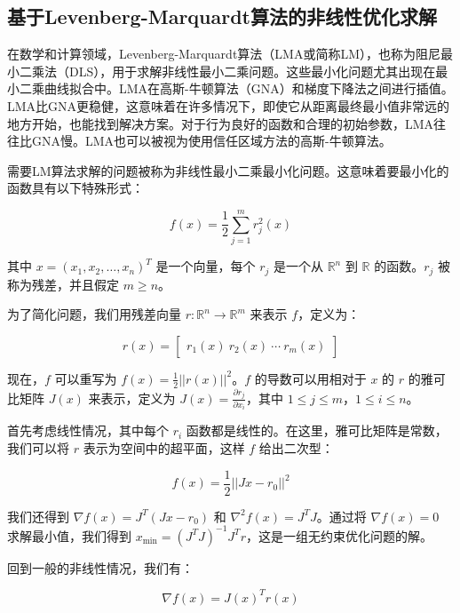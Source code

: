 \subsection{基于Levenberg-Marquardt算法的非线性优化求解}
在数学和计算领域，Levenberg-Marquardt算法（LMA或简称LM）\cite{levenberg1944method}，也称为阻尼最小二乘法（DLS），用于求解非线性最小二乘问题。这些最小化问题尤其出现在最小二乘曲线拟合中。LMA在高斯-牛顿算法（GNA）\cite{}和梯度下降法之间进行插值。LMA比GNA更稳健，这意味着在许多情况下，即使它从距离最终最小值非常远的地方开始，也能找到解决方案。对于行为良好的函数和合理的初始参数，LMA往往比GNA慢。LMA也可以被视为使用信任区域方法的高斯-牛顿算法。

需要LM算法求解的问题被称为非线性最小二乘最小化问题。这意味着要最小化的函数具有以下特殊形式：

\begin{equation}
f(x) = \frac{1}{2} \sum_{j=1}^{m} r_j^2(x)
\end{equation}

其中 $x = (x_1, x_2, \dots, x_n)^T$ 是一个向量，每个 $r_j$ 是一个从 $\mathbb{R}^n$ 到 $\mathbb{R}$ 的函数。$r_j$ 被称为残差，并且假定 $m \geq n$。

为了简化问题，我们用残差向量 $r : \mathbb{R}^n \rightarrow \mathbb{R}^m$ 来表示 $f$，定义为：

\begin{equation}
r(x) =
\begin{bmatrix}
r_1(x) \
r_2(x) \
\cdots \
r_m(x)
\end{bmatrix}
\end{equation}

现在，$f$ 可以重写为 $f(x) = \frac{1}{2} ||r(x)||^2$。$f$ 的导数可以用相对于 $x$ 的 $r$ 的雅可比矩阵 $J(x)$ 来表示，定义为 $J(x) = \frac{\partial r_j}{\partial x_i}$，其中 $1 \leq j \leq m$，$1 \leq i \leq n$。

首先考虑线性情况，其中每个 $r_i$ 函数都是线性的。在这里，雅可比矩阵是常数，我们可以将 $r$ 表示为空间中的超平面，这样 $f$ 给出二次型：

\begin{equation}
f(x) = \frac{1}{2} ||Jx - r_0||^2
\end{equation}

我们还得到 $\nabla f(x) = J^T(Jx - r_0)$ 和 $\nabla^2 f(x) = J^TJ$。通过将 $\nabla f(x) = 0$ 求解最小值，我们得到 $x_\text{min} = (J^TJ)^{-1}J^Tr$，这是一组无约束优化问题的解。

回到一般的非线性情况，我们有：

\begin{equation}
\nabla f(x) = J(x)^T r(x)
\label{eq:grad}
\end{equation}

